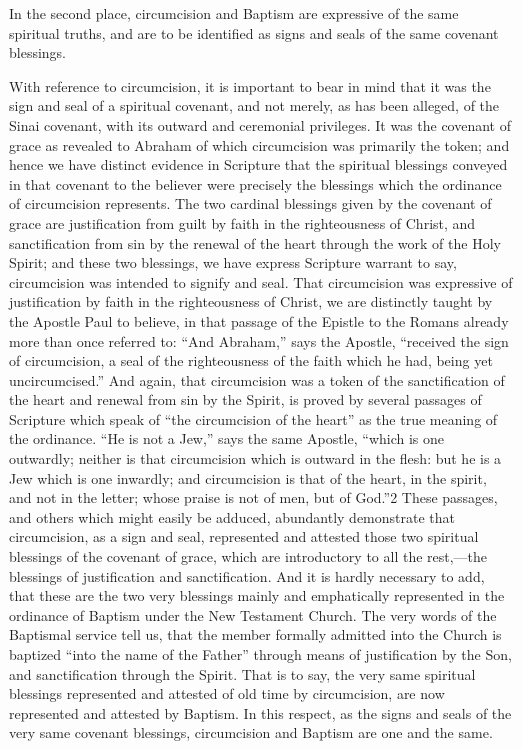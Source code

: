 \documentclass[]{book}
\begin{document}
In the second place, circumcision and Baptism are expressive of the same spiritual truths, and are to be identified as signs and seals of the same covenant blessings.

With reference to circumcision, it is important to bear in mind that it was the sign and seal of a spiritual covenant, and not merely, as has been alleged, of the Sinai covenant, with its outward and ceremonial privileges. It was the covenant of grace as revealed to Abraham of which circumcision was primarily the token; and hence we have distinct evidence in Scripture that the spiritual blessings conveyed in that covenant to the believer were precisely the blessings which the ordinance of circumcision represents. The two cardinal blessings given by the covenant of grace are justification from guilt by faith in the righteousness of Christ, and sanctification from sin by the renewal of the heart through the work of the Holy Spirit; and these two blessings, we have express Scripture warrant to say, circumcision was intended to signify and seal. That circumcision was expressive of justification by faith in the righteousness of Christ, we are distinctly taught by the Apostle Paul to believe, in that passage of the Epistle to the Romans already more than once referred to: ``And Abraham,'' says the Apostle, ``received the sign of circumcision, a seal of the righteousness of the faith which he had, being yet uncircumcised.'' And again, that circumcision was a token of the sanctification of the heart and renewal from sin by the Spirit, is proved by several passages of Scripture which speak of ``the circumcision of the heart'' as the true meaning of the ordinance. ``He is not a Jew,'' says the same Apostle, ``which is one outwardly; neither is that circumcision which is outward in the flesh: but he is a Jew which is one inwardly; and circumcision is that of the heart, in the spirit, and not in the letter; whose praise is not of men, but of God.''2 These passages, and others which might easily be adduced, abundantly demonstrate that circumcision, as a sign and seal, represented and attested those two spiritual blessings of the covenant of grace, which are introductory to all the rest,---the blessings of justification and sanctification. And it is hardly necessary to add, that these are the two very blessings mainly and emphatically represented in the ordinance of Baptism under the New Testament Church. The very words of the Baptismal service tell us, that the member formally admitted into the Church is baptized ``into the name of the Father'' through means of justification by the Son, and sanctification through the Spirit. That is to say, the very same spiritual blessings represented and attested of old time by circumcision, are now represented and attested by Baptism. In this respect, as the signs and seals of the very same covenant blessings, circumcision and Baptism are one and the same.
\end{document}
